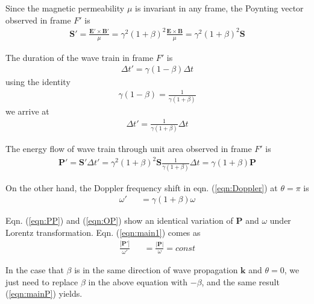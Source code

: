 \documentclass[prd,showpacs,twocolumn]{revtex4-1}
\begin{document}
Since the magnetic permeability $\mu$ is invariant in any frame, the Poynting vector observed in frame $F'$ is
\begin{eqnarray}
\mathbf{S}'=\frac{\mathbf{E}'\times\mathbf{B}'}{\mu}=\gamma^2(1+\beta)^2\frac{\mathbf{E}\times\mathbf{B}}{\mu}=\gamma^2(1+\beta)^2\mathbf{S}
\end{eqnarray}

The duration of the wave train in frame $F'$ is
\begin{eqnarray}
\Delta t'=\gamma(1-\beta)\Delta t
\end{eqnarray}
using the identity
\begin{eqnarray}
\gamma(1-\beta)=\frac{1}{\gamma(1+\beta)}
\end{eqnarray}
we arrive at
\begin{eqnarray}
\Delta t'=\frac{1}{\gamma(1+\beta)}\Delta t
\label{eqn:tP}
\end{eqnarray}

The energy flow of wave train through unit area observed in frame $F'$ is
\begin{eqnarray}
\mathbf{P}'=\mathbf{S}'\Delta t'=\gamma^2(1+\beta)^2\mathbf{S}\frac{1}{\gamma(1+\beta)}\Delta t=\gamma(1+\beta)\mathbf{P}
\label{eqn:PP}
\end{eqnarray}

On the other hand, the Doppler frequency shift in eqn. (\ref{eqn:Doppler}) at $\theta=\pi$ is
\begin{eqnarray}
\omega'&&=\gamma(1+\beta)\omega
\label{eqn:OP}
\end{eqnarray}

Eqn. (\ref{eqn:PP}) and (\ref{eqn:OP}) show an identical variation of $\mathbf{P}$ and $\omega$ under Lorentz transformation. Eqn. (\ref{eqn:main1}) comes as
\begin{eqnarray}
\frac{|\mathbf{P}'|}{\omega'}&&=\frac{|\mathbf{P}|}{\omega}=const
\label{eqn:mainP}
\end{eqnarray}

In the case that $\beta$ is in the same direction of wave propagation $\mathbf{k}$ and $\theta=0$, we just need to replace $\beta$ in the above equation with $-\beta$, and the same result (\ref{eqn:mainP}) yields.
\end{document}
